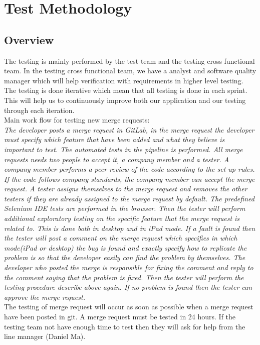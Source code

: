 \section{Test Methodology}
\subsection{Overview}
The testing is mainly performed by the test team and the testing cross functional team. In the testing cross functional team, we have a analyst and software quality manager which will help verification with requirements in higher level testing. The testing is done iterative which mean that all testing is done in each sprint. This will help us to continuously improve both our application and our testing through each iteration.\\

\noindent Main work flow for testing new merge requests:\\
 \emph{The developer posts a merge request in GitLab, in the merge request the developer must specify which feature that have been added and what they believe is important to test. The automated tests in the pipeline is performed. All merge requests needs two people to accept it, a company member and a tester. A company member performs a peer review of the code according to the set up rules. If the code follows company standards, the company member can accept the merge request. A tester assigns themselves to the merge request and removes the other testers if they are already assigned to the merge request by default. The predefined Selenium IDE tests are performed in the browser. Then the tester will perform additional exploratory testing on the specific feature that the merge request is related to. This is done both in desktop and in iPad mode. If a fault is found then the tester will post a comment on the merge request which specifies in which mode(iPad or desktop) the bug is found and exactly specify how to replicate the problem is so that the developer easily can find the problem by themselves. The developer who posted the merge is responsible for fixing the comment and reply to the comment saying that the problem is fixed. Then the tester will perform the testing procedure describe above again. If no problem is found then the tester can approve the merge request.}\\
 
 \noindent The testing of merge request will occur as soon as possible when a merge request have been posted in git. A merge request must be tested in 24 hours. If the testing team not have enough time to test then they will ask for help from the line manager (Daniel Ma).

